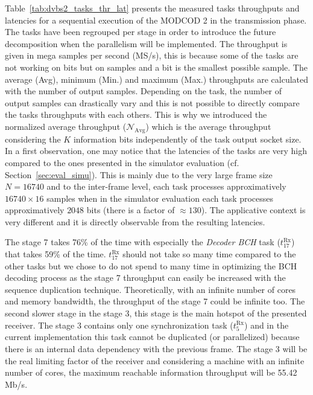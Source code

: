 Table~\ref{tab:dvbs2_tasks_thr_lat} presents the measured tasks throughputs and
latencies for a sequential execution of the MODCOD 2 in the transmission phase.
The tasks have been regrouped per stage in order to introduce the future
decomposition when the parallelism will be implemented. The throughput is given
in mega samples per second (MS/s), this is because some of the tasks are not
working on bits but on samples and a bit is the smallest possible sample. The
average (Avg), minimum (Min.) and maximum (Max.) throughputs are calculated with
the number of output samples. Depending on the task, the number of output
samples can drastically vary and this is not possible to directly compare the
tasks throughputs with each others. This is why we introduced the normalized
average throughput ($\mathcal{N}_\text{Avg}$) which is the average throughput
considering the $K$ information bits independently of the task output socket
size. In a first observation, one may notice that the latencies of the tasks are
very high compared to the ones presented in the simulator evaluation (cf.
Section~\ref{sec:eval_simu}). This is mainly due to the very large frame size
$N = 16740$ and to the inter-frame level, each task processes approximatively
$16740 \times 16$ samples when in the simulator evaluation each task processes
approximatively $2048$ bits (there is a factor of $\approx 130$). The
applicative context is very different and it is directly observable from the
resulting latencies.

The stage 7 takes 76\% of the time with especially the \emph{Decoder BCH} task
($t^\text{Rx}_{17}$) that takes 59\% of the time. $t^\text{Rx}_{17}$ should not
take so many time compared to the other tasks but we chose to do not spend to
many time in optimizing the BCH decoding process as the stage 7 throughput can
easily be increased with the sequence duplication technique. Theoretically, with
an infinite number of cores and memory bandwidth, the throughput of the stage 7
could be infinite too.
The second slower stage in the stage 3, this stage is the main hotspot of the
presented receiver. The stage 3 contains only one synchronization task
($t^\text{Rx}_{5}$) and in the current implementation this task cannot be
duplicated (or parallelized) because there is an internal data dependency with
the previous frame. The stage 3 will be the real limiting factor of the receiver
and considering a machine with an infinite number of cores, the maximum
reachable information throughput will be 55.42 Mb/s.

